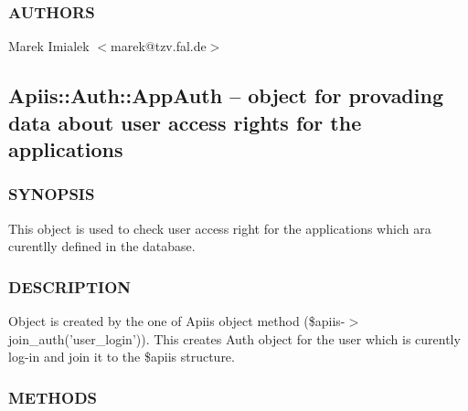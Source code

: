 \subsubsection*{AUTHORS\label{Apiis::Auth::Role_pm_AUTHORS}}


Marek Imialek $<$marek@tzv.fal.de$>$

\subsection{Apiis::Auth::AppAuth -- object for provading data about user access rights for the applications\label{Apiis::Auth::AppAuth_--_object_for_provading_data_about_user_access_rights_for_the_applications}}




\subsubsection*{SYNOPSIS\label{Apiis::Auth::AppAuth_--_object_for_provading_data_about_user_access_rights_for_the_applications_SYNOPSIS}}


This object is used to check user access right for the applications which ara curentlly defined in the database.

\subsubsection*{DESCRIPTION\label{Apiis::Auth::AppAuth_--_object_for_provading_data_about_user_access_rights_for_the_applications_DESCRIPTION}}


Object is created by the one of Apiis object method (\$apiis-$>$join\_auth('user\_login')). This creates Auth object
for the user which is curently log-in and join it to the \$apiis structure.

\subsubsection*{METHODS\label{Apiis::Auth::AppAuth_--_object_for_provading_data_about_user_access_rights_for_the_applications_METHODS}}
